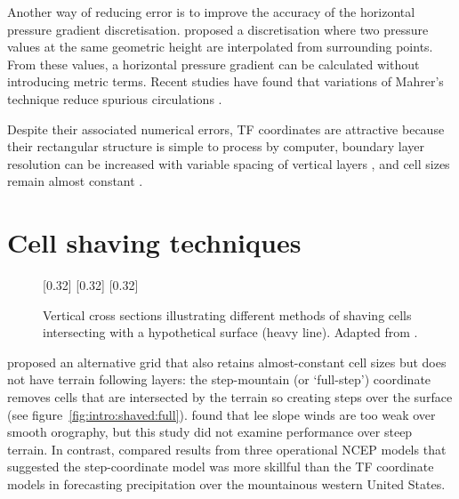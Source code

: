 Another way of reducing error is to improve the accuracy of the horizontal pressure gradient discretisation.  \textcite{mahrer1984} proposed a discretisation where two pressure values at the same geometric height are interpolated from surrounding points.  From these values, a horizontal pressure gradient can be calculated without introducing metric terms.  Recent studies have found that variations of Mahrer's technique reduce spurious circulations \parencites{dempsey-davis1998}{klemp2011}{zaengl2012}.  

Despite their associated numerical errors, TF coordinates are attractive because their rectangular structure is simple to process by computer, boundary layer resolution can be increased with variable spacing of vertical layers \autocite{schaer2002}, and cell sizes remain almost constant \autocite{jebens2011}.

\section{Cell shaving techniques}


\begin{figure}
	\captionsetup[subfigure]{position=b}
	\centering
	[0.32\textwidth]{}
	[0.32\textwidth]{}
	[0.32\textwidth]{}
	\caption{Vertical cross sections illustrating different methods of shaving cells intersecting with a hypothetical surface (heavy line).  Adapted from \textcite{adcroft1997}.}
	\label{fig:intro:shaved}
\end{figure}

\textcite{mesinger1988} proposed an alternative grid that also retains almost-constant cell sizes but does not have terrain following layers: the step-mountain (or `full-step') coordinate removes cells that are intersected by the terrain so creating steps over the surface (see figure~\ref{fig:intro:shaved:full}).  \textcite{gallus-klemp2000} found that lee slope winds are too weak over smooth orography, but this study did not examine performance over steep terrain.  In contrast, \textcite{mesinger2004} compared results from three operational NCEP models that suggested the step-coordinate model was more skillful than the TF coordinate models in forecasting precipitation over the mountainous western United States.

